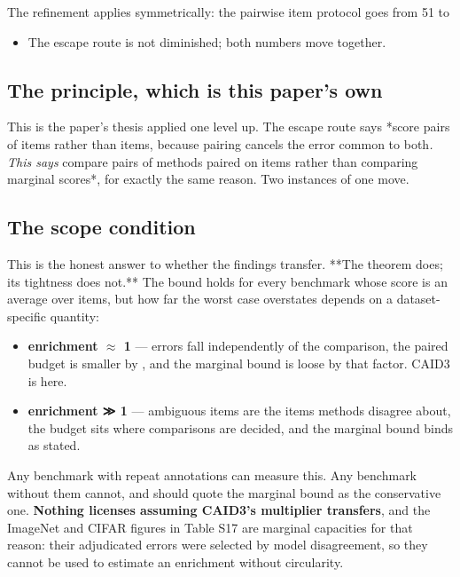 The refinement applies symmetrically: the pairwise item protocol goes from 51 to
\begin{itemize}\itemsep1pt \parskip0pt
\item The escape route is not diminished; both numbers move together.
\end{itemize}


\subsection*{The principle, which is this paper's own}

This is the paper's thesis applied one level up. The escape route says *score
pairs of items rather than items, because pairing cancels the error common to
both\emph{. This says }compare pairs of methods paired on items rather than comparing
marginal scores*, for exactly the same reason. Two instances of one move.


\subsection*{The scope condition}

This is the honest answer to whether the findings transfer. **The theorem does;
its tightness does not.** The bound holds for every benchmark whose score is an
average over items, but how far the worst case overstates depends on a
dataset-specific quantity:

\begin{itemize}\itemsep1pt \parskip0pt
\item \textbf{enrichment $\approx$ 1} --- errors fall independently of the comparison, the paired
  budget is smaller by , and the marginal bound is loose by that
  factor. CAID3 is here.
\item \textbf{enrichment ≫ 1} --- ambiguous items are the items methods disagree about, the
  budget sits where comparisons are decided, and the marginal bound binds as
  stated.
\end{itemize}

Any benchmark with repeat annotations can measure this. Any benchmark without
them cannot, and should quote the marginal bound as the conservative one.
\textbf{Nothing licenses assuming CAID3's multiplier transfers}, and the ImageNet and
CIFAR figures in Table S17 are marginal capacities for that reason: their
adjudicated errors were selected by model disagreement, so they cannot be used
to estimate an enrichment without circularity.


